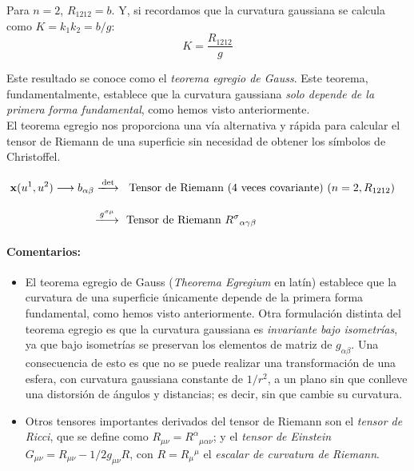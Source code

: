 Para $n=2$, $R_{1212}=b$. Y, si recordamos que la curvatura gaussiana se calcula como $K=k_1k_2=b/g$:
$$
\boxed{K=\frac{R_{1212}}{g}}
$$

Este resultado se conoce como el \emph{teorema egregio de Gauss}. Este teorema, fundamentalmente, establece que la curvatura gaussiana \emph{solo depende de la primera forma fundamental}, como hemos visto anteriormente.\\

El teorema egregio nos proporciona una vía alternativa y rápida para calcular el tensor de Riemann de una superficie sin necesidad de obtener los símbolos de Christoffel.
\begin{align*}
\mathbf{x}(u^1,u^2)\longrightarrow b_{\alpha \beta }\xlongrightarrow{\text{det}}&\text{\parbox{9cm}{\begin{center}
    Tensor de Riemann (4 veces covariante) ($n=2, R_{1212}$)
\end{center}}}\\
\xlongrightarrow{g^{\sigma \mu }} &\ \ \text{Tensor de Riemann } R^\sigma {}_{\alpha \gamma \beta }
\end{align*}
\paragraph{Comentarios:} 
\begin{itemize}
   \item El teorema egregio de Gauss (\emph{Theorema Egregium} en latín) establece que la curvatura de una superficie únicamente depende de la primera forma fundamental, como hemos visto anteriormente. Otra formulación distinta del teorema egregio es que la curvatura gaussiana es \emph{invariante bajo isometrías}, ya que bajo isometrías se preservan los elementos de matriz de $g_{\alpha \beta }$. Una consecuencia de esto es que no se puede realizar una transformación de una esfera, con curvatura gaussiana constante de $1/r^2$, a un plano sin que conlleve una distorsión de ángulos y distancias; es decir, sin que cambie su curvatura.

    \item Otros tensores importantes derivados del tensor de Riemann son el \emph{tensor de Ricci}, que se define como $R_{\mu \nu}=R^\alpha {}_{\mu \alpha \nu }$; y el \emph{tensor de Einstein} $G_{\mu \nu }=R_{\mu \nu }-1/2 g_{\mu \nu } R$, con $R=R_\mu {}^\mu $ el \emph{escalar de curvatura de Riemann}.   
\end{itemize}
